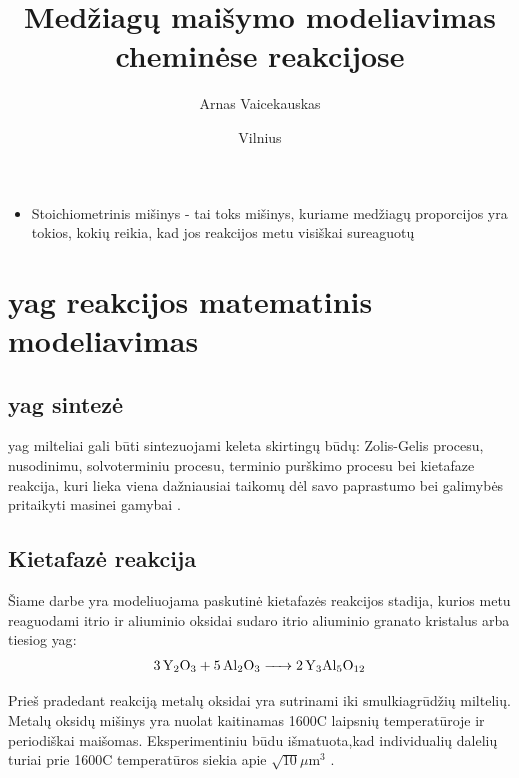 \documentclass{VUMIFInfKursinis}
\institute{Informatikos institutas}  %
\title{Medžiagų maišymo modeliavimas cheminėse
reakcijose}
\author{Arnas Vaicekauskas}
\date{Vilnius \\ \the\year}
\begin{document}
\maketitle

\tableofcontents


\begin{itemize}
\item Stoichiometrinis mišinys - tai toks mišinys, kuriame medžiagų proporcijos yra tokios, kokių reikia, kad jos reakcijos metu visiškai sureaguotų
\end{itemize}




\section{\acs{yag} reakcijos matematinis modeliavimas}

\subsection{\acs{yag} sintezė}

\acs{yag} milteliai gali būti sintezuojami keleta skirtingų būdų: Zolis-Gelis procesu, nusodinimu, solvoterminiu procesu, terminio purškimo procesu bei kietafaze reakcija, kuri lieka viena dažniausiai taikomų dėl savo paprastumo bei galimybės pritaikyti masinei gamybai \cite{zhangNovelSynthesisYAG2005}.

\subsection{Kietafazė reakcija}

Šiame darbe yra modeliuojama paskutinė kietafazės reakcijos stadija, kurios metu reaguodami itrio ir aliuminio oksidai sudaro itrio aliuminio granato kristalus arba tiesiog \acs{yag}:
\begin{align*}
  \ce{3Y_2O_3 + 5Al_2O_3 -> 2Y_3Al_5O_12}
\end{align*}

Prieš pradedant reakciją metalų oksidai yra sutrinami iki smulkiagrūdžių miltelių. Metalų oksidų mišinys yra nuolat kaitinamas 1600\degree C laipsnių temperatūroje ir periodiškai maišomas. Eksperimentiniu būdu išmatuota,kad individualių dalelių turiai prie 1600\degree C temperatūros siekia apie $\sqrt{10}\mu\text{m}^3$ \cite{ivanauskasComputationalModellingYAG2009}.
\end{document}

